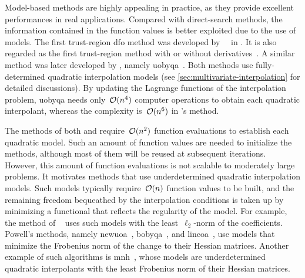 Model-based methods are highly appealing in practice, as they provide excellent performances in real applications.
Compared with direct-search methods, the information contained in the function values is better exploited due to the use of models.
The first trust-region \gls{dfo} method was developed by~\citeauthor{Winfield_1969}~\cite{Winfield_1969,Winfield_1973} in \citeyear{Winfield_1969}.
It is also regarded as the first trust-region method with or without derivatives~\cite[\S~1.2]{Conn_Gould_Toint_2000}.
A similar method was later developed by \citeauthor{Powell_2002}, namely \gls{uobyqa}~\cite{Powell_2002}.
Both methods use fully-determined quadratic interpolation models (see \cref{sec:multivariate-interpolation} for detailed discussions).
By updating the Lagrange functions of the interpolation problem, \gls{uobyqa} needs only~$\operatorname{\mathcal{O}}(n^4)$ computer operations to obtain each quadratic interpolant, whereas the complexity is~$\operatorname{\mathcal{O}}(n^6)$ in \citeauthor{Winfield_1969}'s method.

The methods of both \citeauthor{Winfield_1969} and \citeauthor{Powell_2002} require~$\operatorname{\mathcal{O}}(n^2)$ function evaluations to establish each quadratic model.
Such an amount of function values are needed to initialize the methods, although most of them will be reused at subsequent iterations.
However, this amount of function evaluations is not scalable to moderately large problems.
It motivates methods that use underdetermined quadratic interpolation models.
Such models typically require~$\operatorname{\mathcal{O}}(n)$ function values to be built, and the remaining freedom bequeathed by the interpolation conditions is taken up by minimizing a functional that reflects the regularity of the model.
For example, the method of \citeauthor{Conn_Toint_1996}~\cite{Conn_Toint_1996} uses such models with the least~$\ell_2$-norm of the coefficients.
Powell's methods, namely \gls{newuoa}~\cite{Powell_2006}, \gls{bobyqa}~\cite{Powell_2009}, and \gls{lincoa}~\cite{Powell_2015}, use models that minimize the Frobenius norm of the change to their Hessian matrices.
Another example of such algorithms is \gls{mnh}~\cite{Wild_2008}, whose models are underdetermined quadratic interpolants with the least Frobenius norm of their Hessian matrices.


